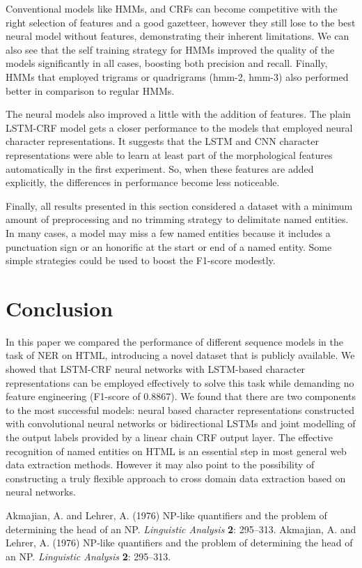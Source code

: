 \documentclass{nle}
\begin{document}
Conventional models like HMMs, and CRFs can become competitive with
the right selection of features and a good gazetteer, however they still lose
to the best neural model without features, demonstrating their inherent limitations.
We can also see that the self training strategy for HMMs improved the quality of 
the models significantly in all cases, boosting both precision and recall. Finally,
HMMs that employed trigrams or quadrigrams (hmm-2, hmm-3) also performed better in
comparison to regular HMMs.

The neural models also improved a little with the addition of features. The plain LSTM-CRF
model gets a closer performance to the models that employed neural character 
representations. It suggests that the LSTM and CNN character representations 
were able to learn at least part of the morphological features automatically in the
first experiment. So, when these features are added explicitly, the differences 
in performance become less noticeable.

Finally, all results presented in this section considered a dataset with a minimum
amount of preprocessing and no trimming strategy to delimitate named entities. In many cases, 
a model may miss a few named entities because it includes a punctuation sign
or an honorific at the start or end of a named entity. Some simple strategies could 
be used to boost the F1-score modestly.

\section{Conclusion}

In this paper we compared the performance of different sequence models in the task of
NER on HTML, introducing a novel dataset that is publicly available. We showed that
LSTM-CRF neural networks with LSTM-based character representations can be employed 
effectively to solve this task while demanding no feature engineering (F1-score of 0.8867).
We found that there are two components to the most successful models: neural based character 
representations constructed with convolutional neural networks or bidirectional LSTMs and joint 
modelling of the output labels provided by a linear chain CRF output layer. The effective recognition 
of named entities on HTML is an essential step in most general web data extraction methods. 
However it may also point to the possibility of constructing a truly flexible approach to
cross domain data extraction based on neural networks.

% 
% 

\begin{thebibliography}{}
   Akmajian, A. and Lehrer, A. (1976) NP-like quantifiers and the
   problem of determining the head of an NP. {\it Linguistic
   Analysis\/} {\bf 2}: 295--313.
   Akmajian, A. and Lehrer, A. (1976) NP-like quantifiers and the
   problem of determining the head of an NP. {\it Linguistic
   Analysis\/} {\bf 2}: 295--313.
\end{thebibliography}
\end{document}
